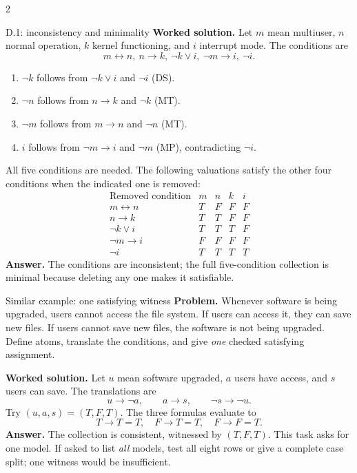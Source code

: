 \documentclass[10pt]{article}
\begin{document}
\begin{multicols}{2}
\begin{workedbox}{D.1: inconsistency and minimality}
\textbf{Worked solution.} Let $m$ mean multiuser, $n$ normal operation,
$k$ kernel functioning, and $i$ interrupt mode. The conditions are
\[
m\leftrightarrow n,\ n\to k,\ \neg k\lor i,\ \neg m\to i,\ \neg i.
\]
\begin{enumerate}
\item $\neg k$ follows from $\neg k\lor i$ and $\neg i$ (DS).
\item $\neg n$ follows from $n\to k$ and $\neg k$ (MT).
\item $\neg m$ follows from $m\to n$ and $\neg n$ (MT).
\item $i$ follows from $\neg m\to i$ and $\neg m$ (MP), contradicting $\neg i$.
\end{enumerate}
All five conditions are needed. The following valuations satisfy the other
four conditions when the indicated one is removed:
\[
\begin{array}{l|cccc}
\text{Removed condition}&m&n&k&i\\\hline
m\leftrightarrow n&T&F&F&F\\
n\to k&T&T&F&F\\
\neg k\lor i&T&T&T&F\\
\neg m\to i&F&F&F&F\\
\neg i&T&T&T&T
\end{array}
\]
\textbf{Answer.} The conditions are inconsistent; the full five-condition
collection is minimal because deleting any one makes it satisfiable.
\end{workedbox}


\begin{workedbox}{Similar example: one satisfying witness}
\textbf{Problem.} Whenever software is being upgraded, users cannot access
the file system. If users can access it, they can save new files. If users
cannot save new files, the software is not being upgraded. Define atoms,
translate the conditions, and give \emph{one} checked satisfying assignment.

\textbf{Worked solution.} Let $u$ mean software upgraded, $a$ users have
access, and $s$ users can save. The translations are
\[
u\to\neg a,\qquad a\to s,\qquad\neg s\to\neg u.
\]
Try $(u,a,s)=(T,F,T)$. The three formulas evaluate to
\[
T\to T=T,\quad F\to T=T,\quad F\to F=T.
\]
\textbf{Answer.} The collection is consistent, witnessed by $(T,F,T)$.
This task asks for one model. If asked to list \emph{all} models, test all
eight rows or give a complete case split; one witness would be insufficient.
\end{workedbox}


\end{multicols}
\end{document}
